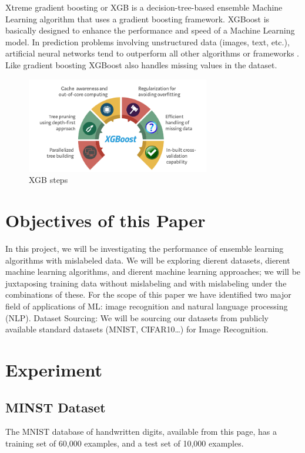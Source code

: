 \documentclass{article}
\begin{document}
Xtreme gradient boosting or XGB is a decision-tree-based ensemble Machine Learning algorithm that uses a gradient boosting framework. XGBoost is basically designed to enhance the performance and speed of a Machine Learning model. In prediction problems involving unstructured data (images, text, etc.), artificial neural networks tend to outperform all other algorithms or frameworks \cite{mujtaba_2021}. Like gradient boosting XGBoost also handles missing values in the dataset.  


\begin{figure}[H]
    \centering
    \includegraphics[width=8cm]{report-imgs/xgb.png}
    \caption{XGB steps}
    \label{xgb}
\end{figure}

\section{Objectives of this Paper}

In this project, we will be investigating the performance of ensemble learning algorithms with mislabeled data. We will be exploring dierent datasets, dierent machine learning algorithms, and dierent machine learning approaches; we will be juxtaposing training data without mislabeling and with mislabeling under the combinations of these.  
For the scope of this paper we have identified two major field of applications of ML: image recognition and natural language processing (NLP). 
Dataset Sourcing:
We will be sourcing our datasets from publicly available standard datasets (MNIST, CIFAR10…) for Image Recognition.


\section{Experiment}

\subsection{MINST Dataset}

The MNIST database of handwritten digits, available from this page, has a training set of 60,000 examples, and a test set of 10,000 examples. 
\end{document}
